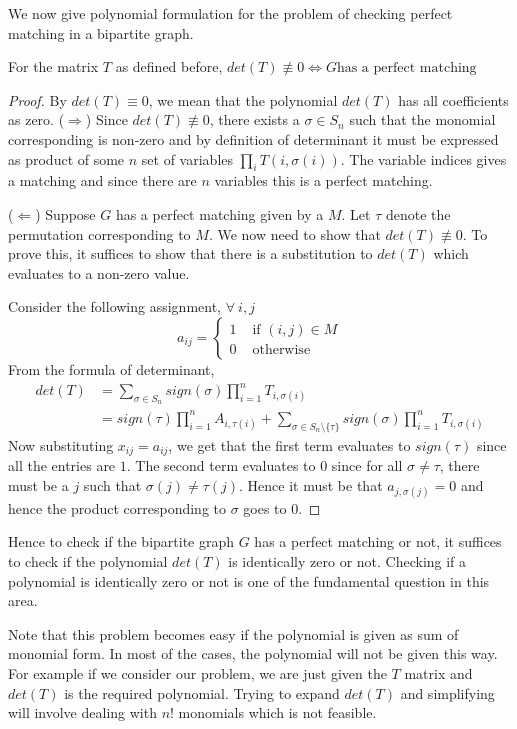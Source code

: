 We now give polynomial formulation for the problem of checking perfect
matching in a bipartite graph.
\begin{claim}
For the matrix $T$ as defined before, $det(T) \not \equiv 0 \iff \text{$G$
has a perfect matching}$
\end{claim}
\begin{proof}
	By $det(T) \equiv 0$, we mean that the polynomial $det(T)$ has all
	coefficients as zero. 
($\Rightarrow$) Since $det(T) \not \equiv 0$, there exists a $\sigma \in S_n$
such that the monomial corresponding is non-zero and by definition of
determinant it must be expressed as product of some $n$ set of variables
$\prod_i T(i,\sigma(i))$. The variable indices gives a matching and since
there are $n$ variables this is a perfect matching.

($\Leftarrow$) Suppose $G$ has a perfect matching given by a $M$. Let $\tau$ 
denote the permutation corresponding to $M$. We now
need to show that $det(T) \not \equiv 0$. To prove this, it suffices to show
that there is a substitution to $det(T)$ which evaluates to a non-zero value. 

Consider the following assignment, $\forall~i,j$ 
\[ a_{ij} = \begin{cases}
		1 & \text{ if } (i,j) \in M \\
		0 & \text{ otherwise}
	\end{cases} 
\]
From the formula of determinant, 
\begin{align*}
	det(T) & = \sum_{\sigma \in S_n} sign(\sigma) \prod_{i=1}^n T_{i,
	\sigma(i)}  \\
	& = sign(\tau)\prod_{i=1}^n A_{i, \tau(i)} + \sum_{\sigma \in S_n
	\setminus \{\tau\}} sign(\sigma)\prod_{i=1}^n T_{i, \sigma(i)}
\end{align*}
Now substituting $x_{ij} = a_{ij}$, we get that the first term evaluates to
$sign(\tau)$ since all the entries are $1$. The second term evaluates to $0$
since for all $\sigma \ne \tau$, there must be a $j$ such that $\sigma(j) \ne
\tau(j)$. Hence it must be that $a_{j, \sigma(j)} = 0$ and hence the product
corresponding to $\sigma$ goes to $0$.
\end{proof}

Hence to check if the bipartite graph $G$ has a perfect matching or not, it
suffices to check if the polynomial $det(T)$ is identically zero or not.
Checking if a polynomial is identically zero or not is one of the fundamental
question in this area.

Note that this problem becomes easy if the polynomial is given as sum of 
monomial form. In most of the cases, the polynomial will not be given this way.
For example if we consider our problem, we are just given the $T$ matrix and
$det(T)$ is the required polynomial. Trying to expand $det(T)$ and simplifying
will involve dealing with $n!$ monomials which is not feasible.

